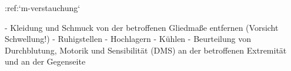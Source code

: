 :ref:`m-verstauchung`
\begin{itemize}
  -   Kleidung und Schmuck von der betroffenen Gliedmaße entfernen
  (Vorsicht Schwellung!)
  -   Ruhigstellen
  -   Hochlagern
  -   Kühlen
  -   Beurteilung von Durchblutung, Motorik und
  Sensibilität (DMS) an der betroffenen Extremität und an
  der Gegenseite
\end{itemize}